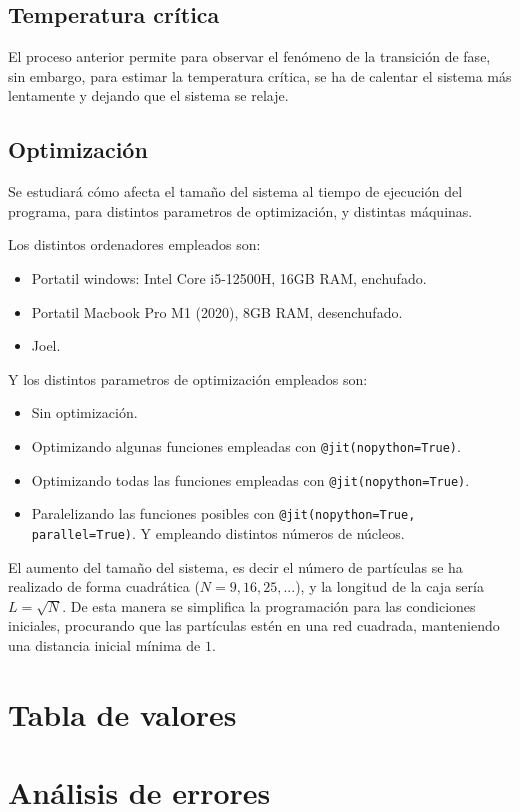 \documentclass[11pt, twoside]{article} %
\begin{document}
\subsection{Temperatura crítica}

El proceso anterior permite para observar el fenómeno de la transición de fase,
sin embargo, para estimar la temperatura crítica, se ha de calentar el sistema más 
lentamente y dejando que el sistema se relaje.

\subsection{Optimización}

Se estudiará cómo afecta el tamaño del sistema al tiempo de ejecución del programa, 
para distintos parametros de optimización, y distintas máquinas.

Los distintos ordenadores empleados son:
\begin{itemize}
    \item Portatil windows: Intel Core i5-12500H, 16GB RAM, enchufado.
    \item Portatil Macbook Pro M1 (2020), 8GB RAM, desenchufado.
    \item Joel.
\end{itemize}
Y los distintos parametros de optimización empleados son:
\begin{itemize}
    \item Sin optimización.
    \item Optimizando algunas funciones empleadas con \texttt{@jit(nopython=True)}.
    \item Optimizando todas las funciones empleadas con \texttt{@jit(nopython=True)}.
    \item Paralelizando las funciones posibles con \texttt{@jit(nopython=True, parallel=True)}.
    Y empleando distintos números de núcleos.
\end{itemize}

El aumento del tamaño del sistema, es decir el número de partículas se ha realizado
de forma cuadrática ($N = 9, 16, 25, ...$), y la longitud de la caja sería $L = \sqrt{N}$.
De esta manera se simplifica la programación para las condiciones iniciales, procurando
que las partículas estén en una red cuadrada, manteniendo una distancia inicial mínima 
de $1$.



\newpage

\appendix

\section{Tabla de valores}


\newpage

\section{Análisis de errores}
\end{document}
